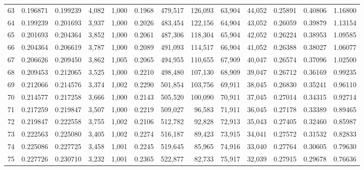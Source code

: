 \begin{tabular}{rrrrrrrrrrrrr}
63  &  0.196871 &  0.199239 &   4,082 &  1,000 &                                     0.1968 &  479,517 &  126,093 &   63,904 &   44,052 &  0.25891 &  0.40806 &  1.16800 \\
64  &  0.199239 &  0.201693 &   3,937 &  1,000 &                                     0.2026 &  483,454 &  122,156 &   64,904 &   43,052 &  0.26059 &  0.39879 &  1.13154 \\
65  &  0.201693 &  0.204364 &   3,852 &  1,000 &                                     0.2061 &  487,306 &  118,304 &   65,904 &   42,052 &  0.26224 &  0.38953 &  1.09585 \\
66  &  0.204364 &  0.206619 &   3,787 &  1,000 &                                     0.2089 &  491,093 &  114,517 &   66,904 &   41,052 &  0.26388 &  0.38027 &  1.06077 \\
67  &  0.206626 &  0.209450 &   3,862 &  1,005 &                                     0.2065 &  494,955 &  110,655 &   67,909 &   40,047 &  0.26574 &  0.37096 &  1.02500 \\
68  &  0.209453 &  0.212065 &   3,525 &  1,000 &                                     0.2210 &  498,480 &  107,130 &   68,909 &   39,047 &  0.26712 &  0.36169 &  0.99235 \\
69  &  0.212066 &  0.214576 &   3,374 &  1,002 &                                     0.2290 &  501,854 &  103,756 &   69,911 &   38,045 &  0.26830 &  0.35241 &  0.96110 \\
70  &  0.214577 &  0.217258 &   3,666 &  1,000 &                                     0.2143 &  505,520 &  100,090 &   70,911 &   37,045 &  0.27014 &  0.34315 &  0.92714 \\
71  &  0.217259 &  0.219847 &   3,507 &  1,000 &                                     0.2219 &  509,027 &   96,583 &   71,911 &   36,045 &  0.27178 &  0.33389 &  0.89465 \\
72  &  0.219847 &  0.222558 &   3,755 &  1,002 &                                     0.2106 &  512,782 &   92,828 &   72,913 &   35,043 &  0.27405 &  0.32460 &  0.85987 \\
73  &  0.222563 &  0.225080 &   3,405 &  1,002 &                                     0.2274 &  516,187 &   89,423 &   73,915 &   34,041 &  0.27572 &  0.31532 &  0.82833 \\
74  &  0.225086 &  0.227725 &   3,458 &  1,001 &                                     0.2245 &  519,645 &   85,965 &   74,916 &   33,040 &  0.27764 &  0.30605 &  0.79630 \\
75  &  0.227726 &  0.230710 &   3,232 &  1,001 &                                     0.2365 &  522,877 &   82,733 &   75,917 &   32,039 &  0.27915 &  0.29678 &  0.76636 \\

\end{tabular}
